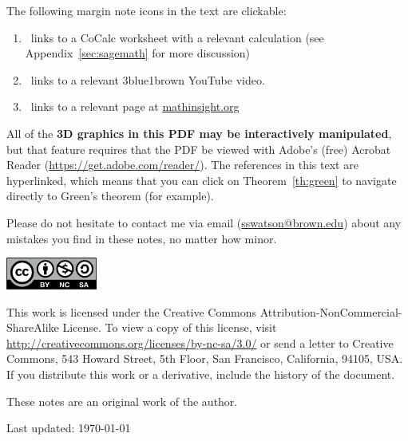 \documentclass{watsonbook}
\begin{document}
The following margin note icons in the text are clickable:
\begin{enumerate}[itemsep=6pt, topsep = -6pt]
\item \href{http://cocalc.com}{\cocalc}\,
  links to a CoCalc worksheet with a relevant calculation (see Appendix~\ref{sec:sagemath} for more
  discussion)
\item \href{http://3blue1brown.com}{\tbob} \, links to a relevant 3blue1brown YouTube video.
\item \href{http://mathinsight.org}{\mi} \, links to a relevant page at \url{mathinsight.org}
\end{enumerate}

\vspace{6pt}

All of the \textbf{3D graphics in this PDF may be interactively manipulated},
but that feature requires that the PDF be viewed with Adobe's (free) Acrobat
Reader
(\href{https://get.adobe.com/reader/}{\url{https://get.adobe.com/reader/}}). The
references in this text are hyperlinked, which means that you can click on
Theorem~\ref{th:green} to navigate directly to Green's theorem (for
example). 

Please do not hesitate to contact me via email
(\url{sswatson@brown.edu}) about any mistakes you find in these notes,
no matter how minor.

\newpage


\null\vfill 

\includegraphics[width=3cm]{figures/cc-by-nc-sa.pdf} \\
{\small
  This work is licensed under the Creative Commons
  Attribution-NonCommercial-ShareAlike License. To view a copy of this
  license, visit 
  \url{http://creativecommons.org/licenses/by-nc-sa/3.0/} 
  or
  send a letter to Creative Commons, 543 Howard Street, 5th Floor, San
  Francisco, California, 94105, USA. If you distribute this work or a
  derivative, include the history of the document.

  These notes are an original work of the author.

  Last updated: \today 
}

\vspace{5cm}

\newpage

\tableofcontents
\end{document}
